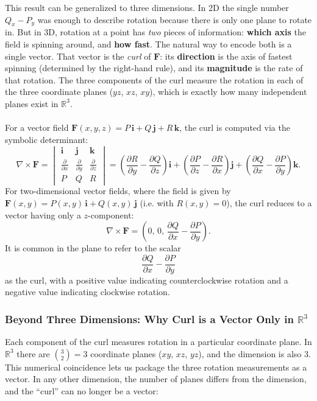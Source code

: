 \noindent This result can be generalized to three dimensions. In 2D the single number $Q_x - P_y$ was enough to describe rotation because there is only one plane to rotate in. But in 3D, rotation at a point has \textit{two} pieces of information: \textbf{which axis} the field is spinning around, and \textbf{how fast}. The natural way to encode both is a single vector. That vector is the \textit{curl} of $\mathbf{F}$: its \textbf{direction} is the axis of fastest spinning (determined by the right-hand rule), and its \textbf{magnitude} is the rate of that rotation. The three components of the curl measure the rotation in each of the three coordinate planes ($yz$, $xz$, $xy$), which is exactly how many independent planes exist in $\mathbb{R}^3$. \\ \\
\noindent For a vector field $\mathbf{F}(x,y,z) = P\,\mathbf{i} + Q\,\mathbf{j} + R\,\mathbf{k}$, the curl is computed via the symbolic determinant:
\[
\nabla \times \mathbf{F} =
\begin{vmatrix}
\mathbf{i} & \mathbf{j} & \mathbf{k} \\
\frac{\partial}{\partial x} & \frac{\partial}{\partial y} & \frac{\partial}{\partial z} \\
P & Q & R
\end{vmatrix}
= \left( \frac{\partial R}{\partial y} - \frac{\partial Q}{\partial z} \right)\mathbf{i}
+ \left( \frac{\partial P}{\partial z} - \frac{\partial R}{\partial x} \right)\mathbf{j}
+ \left( \frac{\partial Q}{\partial x} - \frac{\partial P}{\partial y} \right)\mathbf{k}.
\]
For two-dimensional vector fields, where the field is given by 
\(\mathbf{F}(x,y) = P(x,y)\,\mathbf{i} + Q(x,y)\,\mathbf{j}\) (i.e. with \(R(x,y)=0\)),
the curl reduces to a vector having only a \(z\)-component:
\[
\nabla \times \mathbf{F} = \left( 0,\,0,\,\frac{\partial Q}{\partial x} - \frac{\partial P}{\partial y} \right).
\]
It is common in the plane to refer to the scalar 
\[
\frac{\partial Q}{\partial x} - \frac{\partial P}{\partial y}
\]
as the curl, with a positive value indicating counterclockwise rotation and a negative value indicating clockwise rotation.

\subsubsection*{Beyond Three Dimensions: Why Curl is a Vector Only in $\mathbb{R}^3$}

\noindent Each component of the curl measures rotation in a particular coordinate plane. In $\mathbb{R}^3$ there are $\binom{3}{2} = 3$ coordinate planes ($xy$, $xz$, $yz$), and the dimension is also $3$. This numerical coincidence lets us package the three rotation measurements as a vector. In any other dimension, the number of planes differs from the dimension, and the ``curl'' can no longer be a vector:

